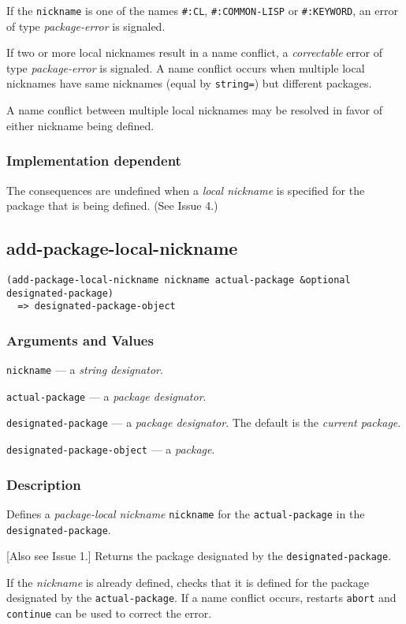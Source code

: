 \documentclass[11pt]{article}
\begin{document}
If the \texttt{nickname} is one of the names \texttt{\#:CL}, \texttt{\#:COMMON-LISP} or \texttt{\#:KEYWORD}, an
error of type \emph{package-error} is signaled.

If two or more local nicknames result in a name conflict, a \emph{correctable} error
of type \emph{package-error} is signaled. A name conflict occurs when multiple local
nicknames have same nicknames (equal by \texttt{string=}) but different packages.

A name conflict between multiple local nicknames may be resolved in favor of
either nickname being defined.
\subsubsection{Implementation dependent}
\label{sec:org3e9a94c}
The consequences are undefined when a \emph{local nickname} is specified for the
package that is being defined. (See Issue 4.)
\subsection{add-package-local-nickname}
\label{sec:org83991e8}
\begin{verbatim}
(add-package-local-nickname nickname actual-package &optional designated-package)
  => designated-package-object
\end{verbatim}
\subsubsection{Arguments and Values}
\label{sec:orgdd3116b}
\texttt{nickname} --- a \emph{string designator}.

\texttt{actual-package} --- a \emph{package designator}.

\texttt{designated-package} --- a \emph{package designator}.
The default is the \emph{current package}.

\texttt{designated-package-object} --- a \emph{package}.
\subsubsection{Description}
\label{sec:org0994600}
Defines a \emph{package-local nickname} \texttt{nickname} for the \texttt{actual-package} in the
\texttt{designated-package}.

[Also see Issue 1.] Returns the package designated by the \texttt{designated-package}.

If the \emph{nickname} is already defined, checks that it is defined for the package
designated by the \texttt{actual-package}. If a name conflict occurs, restarts \texttt{abort}
and \texttt{continue} can be used to correct the error.
\end{document}

